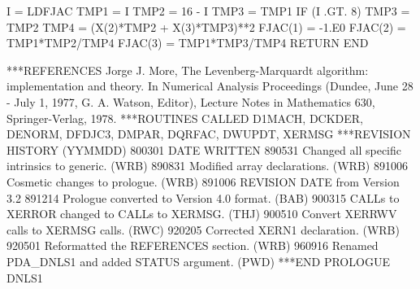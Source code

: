 \documentclass[11pt,twoside,nolof]{starlink}
\begin{document}
\begin{terminalv}
       I = LDFJAC
          TMP1 = I
          TMP2 = 16 - I
          TMP3 = TMP1
          IF (I .GT. 8) TMP3 = TMP2
          TMP4 = (X(2)*TMP2 + X(3)*TMP3)**2
          FJAC(1) = -1.E0
          FJAC(2) = TMP1*TMP2/TMP4
          FJAC(3) = TMP1*TMP3/TMP4
       RETURN
       END

***REFERENCES  Jorge J. More, The Levenberg-Marquardt algorithm:
                 implementation and theory.  In Numerical Analysis
                 Proceedings (Dundee, June 28 - July 1, 1977, G. A.
                 Watson, Editor), Lecture Notes in Mathematics 630,
                 Springer-Verlag, 1978.
***ROUTINES CALLED  D1MACH, DCKDER, DENORM, DFDJC3, DMPAR, DQRFAC,
                    DWUPDT, XERMSG
***REVISION HISTORY  (YYMMDD)
   800301  DATE WRITTEN
   890531  Changed all specific intrinsics to generic.  (WRB)
   890831  Modified array declarations.  (WRB)
   891006  Cosmetic changes to prologue.  (WRB)
   891006  REVISION DATE from Version 3.2
   891214  Prologue converted to Version 4.0 format.  (BAB)
   900315  CALLs to XERROR changed to CALLs to XERMSG.  (THJ)
   900510  Convert XERRWV calls to XERMSG calls.  (RWC)
   920205  Corrected XERN1 declaration.  (WRB)
   920501  Reformatted the REFERENCES section.  (WRB)
   960916  Renamed PDA_DNLS1 and added STATUS argument. (PWD)
***END PROLOGUE  DNLS1
\end{terminalv}
\end{document}
